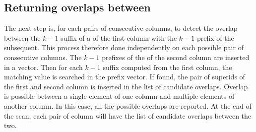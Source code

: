 \subsection{Returning overlaps between \kmers}
\label{sec:skmeroverlap}
The next step is, for each pairs of consecutive columns, to detect the overlap between the $k-1$ suffix of a \kmer of the first column with the $k-1$ prefix of the subsequent. This process therefore done independently on each possible pair of consecutive columns. The $k-1$ prefixes of the \kmers of the second column are inserted in a vector. Then for each $k-1$ suffix computed from the first column, the matching value is searched in the prefix vector. If found, the pair of super\kmer ids of the first and second column is inserted in the list of candidate overlaps. Overlap is possible between a single element of one column and multiple elements of another column. In this case, all the possible overlaps are reported. At the end of the scan, each pair of column will have the list of candidate overlaps between the two.

